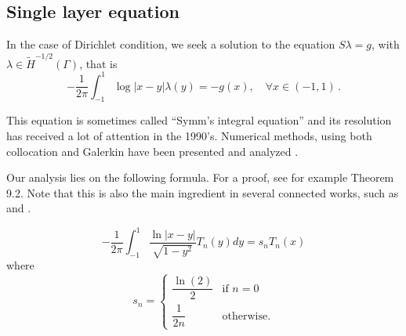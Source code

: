 \documentclass[a4paper]{article}
\begin{document}
\subsection{Single layer equation}

In the case of Dirichlet condition, we seek a solution to the equation $S\lambda = g$, with $\lambda \in \tilde{H}^{-1/2}(\Gamma)$, that is
\begin{equation}
-\frac{1}{2\pi}\int_{-1}^{1} \log|x-y| \lambda(y) = -g(x), \quad \forall x\in (-1,1)\,.\label{Slambda}
\end{equation} 

This equation is sometimes called ``Symm's integral equation'' and its resolution has received a lot of attention in the 1990's. Numerical methods, using both collocation and Galerkin have been presented and analyzed \cite{atkinson1991numerical,yan1988integral,yan1990cosine,sloan1992collocation,yan1989mesh}. 


Our analysis lies on the following formula. For a proof, see for example \cite{mason2002chebyshev} Theorem 9.2. Note that this is also the main ingredient in several connected works, such as \cite{jiang2004second} and \cite{bruno2012second}.

\begin{Lem}
	\[ -\frac{1}{2\pi}\int_{-1}^{1} \frac{\ln|x-y|}{\sqrt{1 - y^2}}T_n(y)dy = s_n T_n(x)\]
	where
	\[s_n = \begin{cases}
	\dfrac{\ln(2)}{2} & \text{if } n=0\\
	\dfrac{1}{2n} & \text{otherwise}.
	\end{cases}\]
	\label{STn}
\end{Lem}
\end{document}
